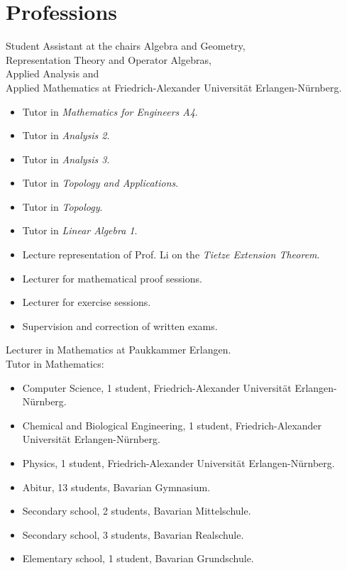\documentclass[a4paper, 11pt]{article}
\newcommand{\years}[1]{\marginnote{\scriptsize #1}}
\begin{document}
	\section*{Professions}
	\years{2023--25} Student Assistant at the chairs Algebra and Geometry, \\ Representation
	Theory and Operator Algebras, \\ Applied Analysis and \\ Applied Mathematics at
	Friedrich-Alexander Universität Erlangen-Nürnberg.
	\begin{itemize}
		\item Tutor in \emph{Mathematics for Engineers A4}.

		\item Tutor in \emph{Analysis 2}.

		\item Tutor in \emph{Analysis 3}.

		\item Tutor in \emph{Topology and Applications}.

		\item Tutor in \emph{Topology}.

		\item Tutor in \emph{Linear Algebra 1}.

		\item Lecture representation of Prof. Li on the \emph{Tietze Extension Theorem}.

		\item Lecturer for mathematical proof sessions.

		\item Lecturer for exercise sessions.

		\item Supervision and correction of written exams.
	\end{itemize}
	\years{2025} Lecturer in Mathematics at Paukkammer Erlangen.\\
	\years{2024--25} Tutor in Mathematics:
	\begin{itemize}
		\item Computer Science, 1 student, Friedrich-Alexander Universität Erlangen-Nürnberg.

		\item Chemical and Biological Engineering, 1 student, Friedrich-Alexander Universität Erlangen-Nürnberg.

		\item Physics, 1 student, Friedrich-Alexander Universität Erlangen-Nürnberg.

		\item Abitur, 13 students, Bavarian Gymnasium.

		\item Secondary school, 2 students, Bavarian Mittelschule.

		\item Secondary school, 3 students, Bavarian Realschule.

		\item Elementary school, 1 student, Bavarian Grundschule.
	\end{itemize}
\end{document}
